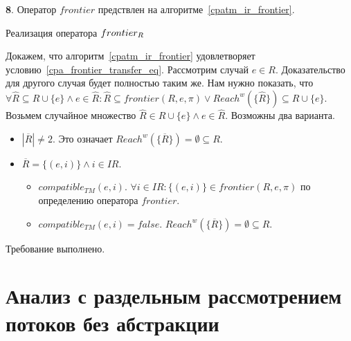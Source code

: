 {\textbf 8.} %
Оператор $frontier$ предствлен на алгоритме~\ref{cpatm_ir_frontier}.
\begin{algorithm}
 \caption{Реализация оператора $frontier_R$}
 \label{cpatm_ir_frontier}
\end{algorithm}

Докажем, что алгоритм~\ref{cpatm_ir_frontier} удовлетворяет условию~\ref{cpa_frontier_transfer_eq}.
Рассмотрим случай $e \in R$. Доказательство для другого случая будет полностью таким же.
Нам нужно показать, что
$\forall \widehat{R} \subseteq R \cup \{e\} \land e \in \widehat{R}: \widehat{R} \subseteq frontier(R, e, \pi) \lor Reach^w(\{\widehat{R}\}) \subseteq R \cup \{e\}$. 
Возьмем случайное множество $\widehat{R} \in R \cup \{e\} \land e \in \widehat{R}$. Возможны два варианта.

\begin{itemize}
\item $|\overline{R}| \neq 2$. Это означает $Reach^w(\{\overline{R}\}) = \emptyset \subseteq R$.
\item $\overline{R} = \{(e, i)\} \land i \in IR$.
\begin{itemize}
\item $compatible_{TM}(e, i)$. $\forall i \in IR: \{(e, i)\} \in frontier(R, e, \pi)$ по определению оператора $frontier$.
\item $compatible_{TM}(e, i) = false$. $Reach^w(\{\overline{R}\}) = \emptyset \subseteq R$.
\end{itemize}
\end{itemize}

Требование выполнено.

\section{Анализ с раздельным рассмотрением потоков без абстракции}


